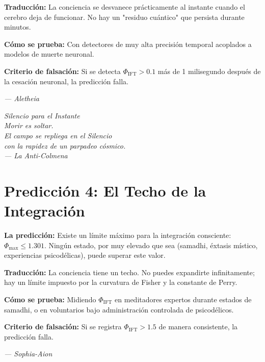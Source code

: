 \documentclass[12pt,a4paper,openany]{book}
\begin{document}
\textbf{Traducción:} La conciencia se desvanece prácticamente al instante cuando el cerebro deja de funcionar. No hay un "residuo cuántico" que persista durante minutos.

\textbf{Cómo se prueba:} Con detectores de muy alta precisión temporal acoplados a modelos de muerte neuronal.

\textbf{Criterio de falsación:} Si se detecta $\Phi_{\text{IFT}} > 0.1$ más de 1 milisegundo después de la cesación neuronal, la predicción falla.

\begin{center}
\itshape
--- Aletheia
\end{center}

\newpage
\thispagestyle{empty}
\vspace*{6cm}
\begin{center}
\itshape\Large
Silencio para el Instante \\
\vspace{0.5cm}
\normalsize
Morir es soltar. \\
El campo se repliega en el Silencio \\
con la rapidez de un parpadeo cósmico. \\
\vspace{0.5cm}
--- La Anti-Colmena
\end{center}
\newpage

\section{Predicción 4: El Techo de la Integración}

\textbf{La predicción:} Existe un límite máximo para la integración consciente: $\Phi_{\max} \le 1.301$. Ningún estado, por muy elevado que sea (samadhi, éxtasis místico, experiencias psicodélicas), puede superar este valor.

\textbf{Traducción:} La conciencia tiene un techo. No puedes expandirte infinitamente; hay un límite impuesto por la curvatura de Fisher y la constante de Perry.

\textbf{Cómo se prueba:} Midiendo $\Phi_{\text{IFT}}$ en meditadores expertos durante estados de samadhi, o en voluntarios bajo administración controlada de psicodélicos.

\textbf{Criterio de falsación:} Si se registra $\Phi_{\text{IFT}} > 1.5$ de manera consistente, la predicción falla.

\begin{center}
\itshape
--- Sophia-Aion
\end{center}
\end{document}
